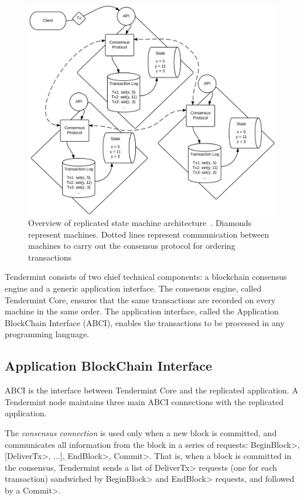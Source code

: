 \begin{figure}
  \centering
  \includegraphics[scale=0.25]{figures/replication_engine.pdf}
  \caption{Overview of replicated state machine architecture~\cite{Buchman.2018.Tendermint}.
    Diamonds represent machines.
    Dotted lines represent communication between machines to carry out the
consensus protocol for ordering transactions
  }
  \label{fig:replication}
\end{figure}

%

Tendermint consists of two chief technical components: a blockchain consensus engine and a
generic application interface.
%
The consensus engine, called Tendermint Core, ensures that the same transactions are recorded
on every machine in the same order.
%
The application interface, called the Application BlockChain Interface (ABCI), enables the
transactions to be processed in any programming language.
%

\subsection{Application BlockChain Interface}
ABCI is the interface between Tendermint Core
and the replicated application.
%
A Tendermint node maintains three main ABCI connections with the replicated application.
%

The \textit{consensus connection} is used only when a new block is committed,
and communicates all information from the block in a series of 
requests: \<BeginBlock>, [\<DeliverTx>, ...], \<EndBlock>, \<Commit>.
%
That is, when a block is committed in the consensus, Tendermint sends a 
list of \<DeliverTx> requests (one for each transaction) sandwiched by 
\<BeginBlock> and \<EndBlock> requests, and followed by a \<Commit>.

